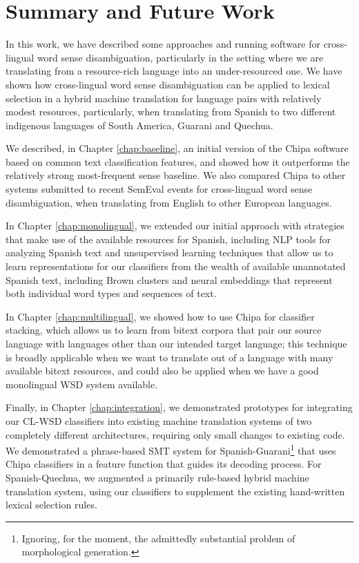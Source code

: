 \chapter{Summary and Future Work}
\label{chap:conclusions}

In this work, we have described some approaches and running software for
cross-lingual word sense disambiguation, particularly in the setting where we
are translating from a resource-rich language into an under-resourced one.  We
have shown how cross-lingual word sense disambiguation can be applied to
lexical selection in a hybrid machine translation for language pairs with
relatively modest resources, particularly, when translating from Spanish to two
different indigenous languages of South America, Guarani and Quechua.

We described, in Chapter \ref{chap:baseline}, an initial version of the Chipa
software based on common text classification features, and showed how it
outperforms the relatively strong most-frequent sense baseline. We also
compared Chipa to other systems submitted to recent SemEval events for
cross-lingual word sense disambiguation, when translating from English to other
European languages.

In Chapter \ref{chap:monolingual}, we extended our initial approach with
strategies that make use of the available resources for Spanish, including NLP
tools for analyzing Spanish text and unsupervised learning techniques that
allow us to learn representations for our classifiers from the wealth of
available unannotated Spanish text, including Brown clusters and neural
embeddings that represent both individual word types and sequences of text.

In Chapter \ref{chap:multilingual}, we showed how to use Chipa for classifier
stacking, which allows us to learn from bitext corpora that pair our source
language with languages other than our intended target language; this technique
is broadly applicable when we want to translate out of a language with many
available bitext resources, and could also be applied when we have a good
monolingual WSD system available.

Finally, in Chapter \ref{chap:integration}, we demonstrated prototypes for
integrating our CL-WSD classifiers into existing machine translation systems of
two completely different architectures, requiring only small changes to
existing code.  We demonstrated a phrase-based SMT system for
Spanish-Guarani\footnote{Ignoring, for the moment, the admittedly substantial
problem of morphological generation.} that uses Chipa classifiers in a feature
function that guides its decoding process. For Spanish-Quechua, we augmented a
primarily rule-based hybrid machine translation system, using our classifiers
to supplement the existing hand-written lexical selection rules.

